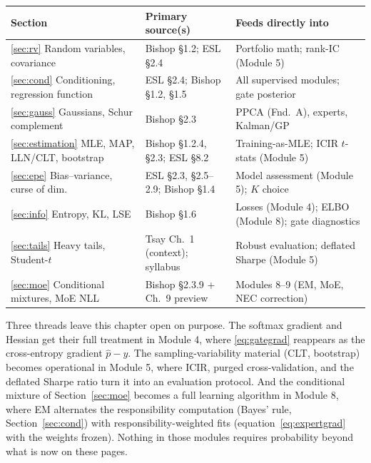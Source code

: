 \documentclass[11pt]{article}
\numberwithin{equation}{section}
\theoremstyle{plain}
\theoremstyle{definition}
\theoremstyle{remark}
\begin{document}
\begin{center}
\small
\begin{tabular}{@{}lll@{}}
\toprule
Section & Primary source(s) & Feeds directly into \\
\midrule
\ref{sec:rv} Random variables, covariance & Bishop \S1.2; ESL \S2.4 & Portfolio math; rank-IC (Module 5) \\
\ref{sec:cond} Conditioning, regression function & ESL \S2.4; Bishop \S1.2, \S1.5 & All supervised modules; gate posterior \\
\ref{sec:gauss} Gaussians, Schur complement & Bishop \S2.3 & PPCA (Fnd.\ A), experts, Kalman/GP \\
\ref{sec:estimation} MLE, MAP, LLN/CLT, bootstrap & Bishop \S1.2.4, \S2.3; ESL \S8.2 & Training-as-MLE; ICIR $t$-stats (Module 5) \\
\ref{sec:epe} Bias--variance, curse of dim. & ESL \S2.3, \S2.5--2.9; Bishop \S1.4 & Model assessment (Module 5); $K$ choice \\
\ref{sec:info} Entropy, KL, LSE & Bishop \S1.6 & Losses (Module 4); ELBO (Module 8); gate diagnostics \\
\ref{sec:tails} Heavy tails, Student-$t$ & Tsay Ch.\ 1 (context); syllabus & Robust evaluation; deflated Sharpe (Module 5) \\
\ref{sec:moe} Conditional mixtures, MoE NLL & Bishop \S2.3.9 + Ch.\ 9 preview & Modules 8--9 (EM, MoE, NEC correction) \\
\bottomrule
\end{tabular}
\end{center}

\medskip
Three threads leave this chapter open on purpose. The softmax gradient and Hessian get their full treatment in Module 4, where \eqref{eq:gategrad} reappears as the cross-entropy gradient $\hat{p} - y$. The sampling-variability material (CLT, bootstrap) becomes operational in Module 5, where ICIR, purged cross-validation, and the deflated Sharpe ratio turn it into an evaluation protocol. And the conditional mixture of Section~\ref{sec:moe} becomes a full learning algorithm in Module 8, where EM alternates the responsibility computation (Bayes' rule, Section~\ref{sec:cond}) with responsibility-weighted fits (equation~\eqref{eq:expertgrad} with the weights frozen). Nothing in those modules requires probability beyond what is now on these pages.
\end{document}
